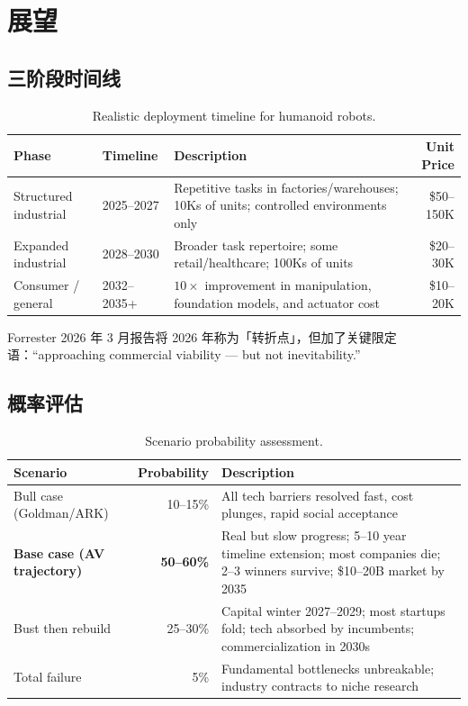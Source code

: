 \chapter{展望}
\label{ch:outlook}

\section{三阶段时间线}

\begin{table}[htbp]
\centering
\caption{Realistic deployment timeline for humanoid robots.}
\label{tab:timeline}
\begin{tabularx}{\textwidth}{llXr}
\toprule
\rowcolor{figLightGray}
\textbf{Phase} & \textbf{Timeline} & \textbf{Description} & \textbf{Unit Price} \\
\midrule
Structured industrial & 2025--2027 & Repetitive tasks in factories/warehouses; 10Ks of units; controlled environments only & \$50--150K \\
Expanded industrial & 2028--2030 & Broader task repertoire; some retail/healthcare; 100Ks of units & \$20--30K \\
Consumer / general & 2032--2035+ & $10\times$ improvement in manipulation, foundation models, and actuator cost & \$10--20K \\
\bottomrule
\end{tabularx}
\end{table}

Forrester 2026 年 3 月报告\cite{forrester2026humanoid}将 2026 年称为「转折点」，但加了关键限定语：``approaching commercial viability --- but not inevitability.''

\section{概率评估}

\begin{table}[htbp]
\centering
\caption{Scenario probability assessment.}
\label{tab:scenarios}
\begin{tabularx}{\textwidth}{lrX}
\toprule
\rowcolor{figLightGray}
\textbf{Scenario} & \textbf{Probability} & \textbf{Description} \\
\midrule
Bull case (Goldman/ARK) & 10--15\% & All tech barriers resolved fast, cost plunges, rapid social acceptance \\
\textbf{Base case (AV trajectory)} & \textbf{50--60\%} & Real but slow progress; 5--10 year timeline extension; most companies die; 2--3 winners survive; \$10--20B market by 2035 \\
Bust then rebuild & 25--30\% & Capital winter 2027--2029; most startups fold; tech absorbed by incumbents; commercialization in 2030s \\
Total failure & 5\% & Fundamental bottlenecks unbreakable; industry contracts to niche research \\
\bottomrule
\end{tabularx}
\end{table}

